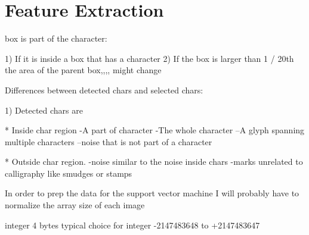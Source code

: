 \chapter{Feature Extraction}

box is part of the character:

1)  If it is inside a box that has a character
2)  If the box is larger than 1 / 20th the area of the parent box,,,,   might change


Differences between detected chars and selected chars:

1) Detected chars are

* Inside char region
 -A part of character
 -The whole character
 --A glyph spanning multiple characters
 --noise that is not part of a character

* Outside char region.
 -noise similar to the noise inside chars
 -marks unrelated to calligraphy like smudges or stamps
 
In order to prep the data for the support vector machine I will probably have to normalize the array size of each image

integer	4 bytes	typical choice for integer	-2147483648 to +2147483647

